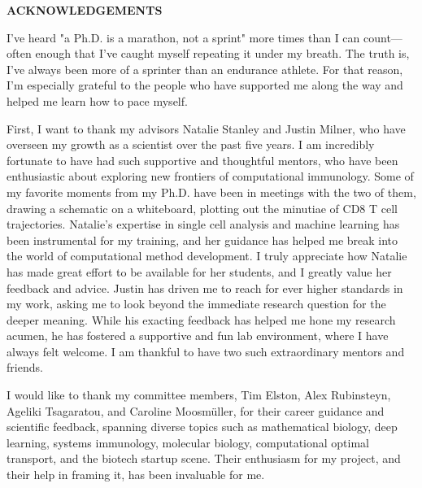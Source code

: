 
\begin{center}
\vspace*{52pt}
{\normalfont \textbf{ACKNOWLEDGEMENTS}}
\end{center}

I've heard "a Ph.D. is a marathon, not a sprint" more times than I can count---often enough that I've caught myself repeating it under my breath. The truth is, I've always been more of a sprinter than an endurance athlete. For that reason, I'm especially grateful to the people who have supported me along the way and helped me learn how to pace myself.

First, I want to thank my advisors Natalie Stanley and Justin Milner, who have overseen my growth as a scientist over the past five years. I am incredibly fortunate to have had such supportive and thoughtful mentors, who have been enthusiastic about exploring new frontiers of computational immunology. Some of my favorite moments from my Ph.D. have been in meetings with the two of them, drawing a schematic on a whiteboard, plotting out the minutiae of CD8 T cell trajectories. Natalie's expertise in single cell analysis and machine learning has been instrumental for my training, and her guidance has helped me break into the world of computational method development. I truly appreciate how Natalie has made great effort to be available for her students, and I greatly value her feedback and advice. Justin has driven me to reach for ever higher standards in my work, asking me to look beyond the immediate research question for the deeper meaning. While his exacting feedback has helped me hone my research acumen, he has fostered a supportive and fun lab environment, where I have always felt welcome. I am thankful to have two such extraordinary mentors and friends.

I would like to thank my committee members, Tim Elston, Alex Rubinsteyn, Ageliki Tsagaratou, and Caroline Moosm\"uller, for their career guidance and scientific feedback, spanning diverse topics such as mathematical biology, deep learning, systems immunology, molecular biology, computational optimal transport, and the biotech startup scene. Their enthusiasm for my project, and their help in framing it, has been invaluable for me.


